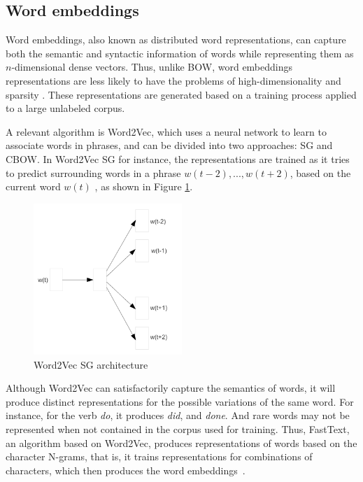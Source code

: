 \subsection{Word embeddings}
 




Word embeddings, also known as distributed word representations, can capture both the semantic and syntactic information of words while representing them as $n$-dimensional dense vectors. Thus, unlike \gls{BOW}, word embeddings representations are less likely to have the problems of high-dimensionality and sparsity \cite{Lai2016}. 
These representations are generated based on a training process applied to a large unlabeled corpus.

A relevant algorithm is Word2Vec, which uses a neural network to learn to associate words in phrases, and can be divided into two approaches: \gls{SG} and \gls{CBOW}.
In Word2Vec \gls{SG} for instance, the representations are trained as it tries to predict surrounding words in a phrase $w(t-2), ..., w(t+2)$, based on the current word $w(t)$ \cite{Mikolov2013}, as shown in Figure \ref{fig:word2vec_sg}.

\begin{figure}[htb]
    \centering    
    \caption{Word2Vec SG architecture}
    \label{fig:word2vec_sg}
    \includegraphics[width=0.5\textwidth]{images/chapters/word2vec_sg.png}
    
\end{figure}


Although Word2Vec can satisfactorily capture the semantics of words, it will produce distinct representations for the possible variations of the same word. For instance, for the verb \textit{do}, it produces \textit{did}, and \textit{done}. And rare words may not be represented when not contained in the corpus used for training. Thus,  FastText, an algorithm based on Word2Vec, produces representations of words based on the character N-grams, that is, it trains representations for combinations of characters, which then produces the word embeddings~\cite{Bojanowski2016}. 

